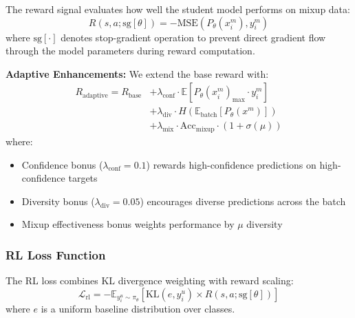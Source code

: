 \documentclass{scrartcl}
\begin{document}
The reward signal evaluates how well the student model performs on mixup data:
\begin{equation}
R(s, a; \text{sg}[\theta]) = -\text{MSE}(P_\theta(x_i^m), y_i^m)
\end{equation}
where $\text{sg}[\cdot]$ denotes stop-gradient operation to prevent direct gradient flow through the model parameters during reward computation.

\textbf{Adaptive Enhancements:} We extend the base reward with:
\begin{align}
R_{\text{adaptive}} = R_{\text{base}} &+ \lambda_{\text{conf}} \cdot \mathbb{E}[P_\theta(x_i^m)_{\max} \cdot y_i^m] \\
&+ \lambda_{\text{div}} \cdot H(\mathbb{E}_{\text{batch}}[P_\theta(x^m)]) \\
&+ \lambda_{\text{mix}} \cdot \text{Acc}_{\text{mixup}} \cdot (1 + \sigma(\mu))
\end{align}
where:
\begin{itemize}
    \item Confidence bonus ($\lambda_{\text{conf}} = 0.1$) rewards high-confidence predictions on high-confidence targets
    \item Diversity bonus ($\lambda_{\text{div}} = 0.05$) encourages diverse predictions across the batch
    \item Mixup effectiveness bonus weights performance by $\mu$ diversity
\end{itemize}

\subsubsection{RL Loss Function}

The RL loss combines KL divergence weighting with reward scaling:
\begin{equation}
\mathcal{L}_{\text{rl}} = -\mathbb{E}_{y_i^u \sim \pi_\theta} [\text{KL}(e, y_i^u) \times R(s,a;\text{sg}[\theta])]
\end{equation}
where $e$ is a uniform baseline distribution over classes.
\end{document}
